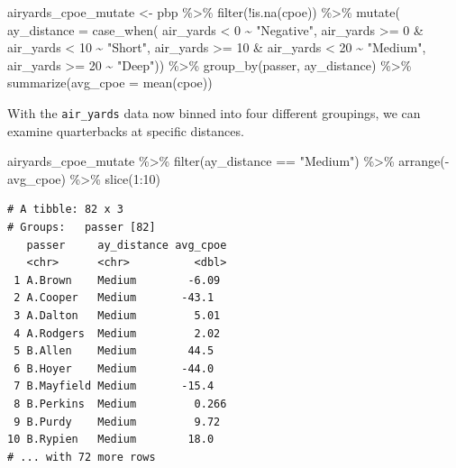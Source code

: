 \documentclass[
  letterpaper,
]{krantz}
\newenvironment{Shaded}{\begin{snugshade}}{\end{snugshade}}
\newcommand{\AttributeTok}[1]{\textcolor[rgb]{0.40,0.45,0.13}{#1}}
\newcommand{\DecValTok}[1]{\textcolor[rgb]{0.68,0.00,0.00}{#1}}
\newcommand{\FunctionTok}[1]{\textcolor[rgb]{0.28,0.35,0.67}{#1}}
\newcommand{\NormalTok}[1]{\textcolor[rgb]{0.00,0.23,0.31}{#1}}
\newcommand{\OtherTok}[1]{\textcolor[rgb]{0.00,0.23,0.31}{#1}}
\newcommand{\SpecialCharTok}[1]{\textcolor[rgb]{0.37,0.37,0.37}{#1}}
\newcommand{\StringTok}[1]{\textcolor[rgb]{0.13,0.47,0.30}{#1}}
\begin{document}
\begin{Shaded}
\begin{Highlighting}[]
\NormalTok{airyards\_cpoe\_mutate }\OtherTok{\textless{}{-}}\NormalTok{ pbp }\SpecialCharTok{\%\textgreater{}\%}
  \FunctionTok{filter}\NormalTok{(}\SpecialCharTok{!}\FunctionTok{is.na}\NormalTok{(cpoe)) }\SpecialCharTok{\%\textgreater{}\%}
  \FunctionTok{mutate}\NormalTok{(}
    \AttributeTok{ay\_distance =} \FunctionTok{case\_when}\NormalTok{(}
\NormalTok{      air\_yards }\SpecialCharTok{\textless{}} \DecValTok{0} \SpecialCharTok{\textasciitilde{}} \StringTok{"Negative"}\NormalTok{,}
\NormalTok{      air\_yards }\SpecialCharTok{\textgreater{}=} \DecValTok{0} \SpecialCharTok{\&}\NormalTok{ air\_yards }\SpecialCharTok{\textless{}} \DecValTok{10} \SpecialCharTok{\textasciitilde{}} \StringTok{"Short"}\NormalTok{,}
\NormalTok{      air\_yards }\SpecialCharTok{\textgreater{}=} \DecValTok{10} \SpecialCharTok{\&}\NormalTok{ air\_yards }\SpecialCharTok{\textless{}} \DecValTok{20} \SpecialCharTok{\textasciitilde{}} \StringTok{"Medium"}\NormalTok{,}
\NormalTok{      air\_yards }\SpecialCharTok{\textgreater{}=} \DecValTok{20} \SpecialCharTok{\textasciitilde{}} \StringTok{"Deep"}\NormalTok{)) }\SpecialCharTok{\%\textgreater{}\%}
  \FunctionTok{group\_by}\NormalTok{(passer, ay\_distance) }\SpecialCharTok{\%\textgreater{}\%}
  \FunctionTok{summarize}\NormalTok{(}\AttributeTok{avg\_cpoe =} \FunctionTok{mean}\NormalTok{(cpoe))}
\end{Highlighting}
\end{Shaded}

With the \texttt{air\_yards} data now binned into four different
groupings, we can examine quarterbacks at specific distances.

\begin{Shaded}
\begin{Highlighting}[]
\NormalTok{airyards\_cpoe\_mutate }\SpecialCharTok{\%\textgreater{}\%}
  \FunctionTok{filter}\NormalTok{(ay\_distance }\SpecialCharTok{==} \StringTok{"Medium"}\NormalTok{) }\SpecialCharTok{\%\textgreater{}\%}
  \FunctionTok{arrange}\NormalTok{(}\SpecialCharTok{{-}}\NormalTok{avg\_cpoe) }\SpecialCharTok{\%\textgreater{}\%}
  \FunctionTok{slice}\NormalTok{(}\DecValTok{1}\SpecialCharTok{:}\DecValTok{10}\NormalTok{)}
\end{Highlighting}
\end{Shaded}

\begin{verbatim}
# A tibble: 82 x 3
# Groups:   passer [82]
   passer     ay_distance avg_cpoe
   <chr>      <chr>          <dbl>
 1 A.Brown    Medium        -6.09 
 2 A.Cooper   Medium       -43.1  
 3 A.Dalton   Medium         5.01 
 4 A.Rodgers  Medium         2.02 
 5 B.Allen    Medium        44.5  
 6 B.Hoyer    Medium       -44.0  
 7 B.Mayfield Medium       -15.4  
 8 B.Perkins  Medium         0.266
 9 B.Purdy    Medium         9.72 
10 B.Rypien   Medium        18.0  
# ... with 72 more rows
\end{verbatim}
\end{document}
